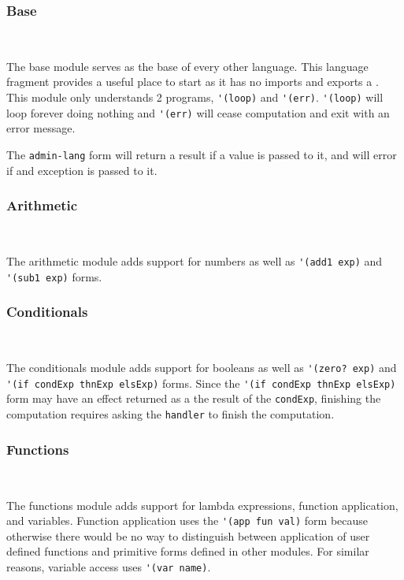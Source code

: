 \subsubsection{Base}
~

The base module serves as the base of every other language. This language fragment provides a useful place to start as it has no imports and exports a \langSig. This module only understands 2 programs, \verb#'(loop)# and \verb#'(err)#. \verb#'(loop)# will loop forever doing nothing and \verb#'(err)# will cease computation and exit with an error message.

The \verb#admin-lang# form will return a result if a value is passed to it, and will error if and exception is passed to it.

\subsubsection{Arithmetic}
~

The arithmetic module adds support for numbers as well as \verb#'(add1 exp)# and \verb#'(sub1 exp)# forms.

\subsubsection{Conditionals}
~

The conditionals module adds support for booleans as well as \verb#'(zero? exp)# and \verb#'(if condExp thnExp elsExp)# forms. Since the \verb#'(if condExp thnExp elsExp)# form may have an effect returned as a the result of the \verb#condExp#, finishing the computation requires asking the \verb#handler# to finish the computation.

\subsubsection{Functions}
~

The functions module adds support for lambda expressions, function application, and variables. Function application uses the \verb#'(app fun val)# form because otherwise there would be no way to distinguish between application of user defined functions and primitive forms defined in other modules. For similar reasons, variable access uses \verb#'(var name)#.


